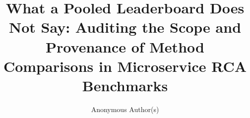\documentclass[acmsmall,screen,review,anonymous]{acmart}
\begin{document}
\title{What a Pooled Leaderboard Does Not Say: Auditing the Scope and Provenance of Method Comparisons in Microservice RCA Benchmarks}

\author{Anonymous Author(s)}



\maketitle














\end{document}
